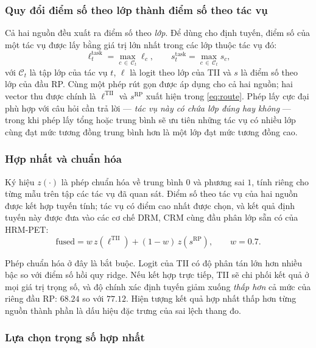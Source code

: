 \documentclass[11pt,a4paper]{article}
\begin{document}
\subsubsection{Quy đổi điểm số theo lớp thành điểm số theo tác vụ}

Cả hai nguồn đều xuất ra điểm số theo \emph{lớp}. Để dùng cho định tuyến, điểm số
của một tác vụ được lấy bằng giá trị lớn nhất trong các lớp thuộc tác vụ đó:
\begin{equation}
\ell^{\mathrm{task}}_t = \max_{c \,\in\, \mathcal{C}_t} \ell_c ,
\qquad
s^{\mathrm{task}}_t = \max_{c \,\in\, \mathcal{C}_t} s_c ,
\label{eq:taskscore}
\end{equation}
với $\mathcal{C}_t$ là tập lớp của tác vụ $t$, $\ell$ là logit theo lớp của TII
và $s$ là điểm số theo lớp của đầu RP. Cùng một phép rút gọn được áp dụng cho cả
hai nguồn; hai vector thu được chính là $\ell^{\mathrm{TII}}$ và
$s^{\mathrm{RP}}$ xuất hiện trong \eqref{eq:route}. Phép lấy cực đại phù hợp với câu
hỏi cần trả lời --- \emph{tác vụ này có chứa lớp đúng hay không} --- trong khi
phép lấy tổng hoặc trung bình sẽ ưu tiên những tác vụ có nhiều lớp cùng đạt mức
tương đồng trung bình hơn là một lớp đạt mức tương đồng cao.

\subsubsection{Hợp nhất và chuẩn hóa}

Ký hiệu $z(\cdot)$ là phép chuẩn hóa về trung bình $0$ và phương sai $1$, tính
riêng cho từng mẫu trên tập các tác vụ đã quan sát. Điểm số theo tác vụ của hai
nguồn được kết hợp tuyến tính; tác vụ có điểm cao nhất được chọn, và kết quả
định tuyến này được đưa vào các cơ chế DRM, CRM cùng đầu phân lớp sẵn có của
HRM-PET:
\begin{equation}
\mathrm{fused} = w\, z(\ell^{\mathrm{TII}}) + (1-w)\, z(s^{\mathrm{RP}}),
\qquad w = 0.7 .
\label{eq:route}
\end{equation}

Phép chuẩn hóa ở đây là bắt buộc. Logit của TII có độ phân tán lớn hơn nhiều bậc
so với điểm số hồi quy ridge. Nếu kết hợp trực tiếp, TII sẽ chi phối kết quả ở
mọi giá trị trọng số, và độ chính xác định tuyến giảm xuống \emph{thấp hơn} cả
mức của riêng đầu RP: $68.24$ so với $77.12$. Hiện tượng kết quả hợp nhất thấp
hơn từng nguồn thành phần là dấu hiệu đặc trưng của sai lệch thang đo.

\subsubsection{Lựa chọn trọng số hợp nhất}
\label{sec:choose-w}
\end{document}
